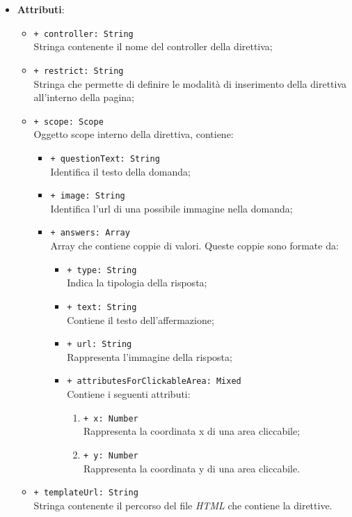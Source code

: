 \begin{itemize}
\begin{itemize}
			\end{itemize}
			\item \textbf{Attributi}: 
				\begin{itemize}
					\item \texttt{+ controller: String} \\ Stringa contenente il nome del controller della direttiva;
					\item \texttt{+ restrict: String} \\ Stringa che permette di definire le modalità di inserimento della direttiva all'interno della pagina;
					\item \texttt{+ scope: Scope} \\ Oggetto scope interno della direttiva, contiene:
					\begin{itemize}	
						\item \texttt{+ questionText: String} \\ Identifica il testo della domanda;
						\item \texttt{+ image: String} \\ Identifica l'url di una possibile immagine nella domanda;
						\item \texttt{+ answers: Array} \\ Array che contiene coppie di valori. Queste coppie sono formate da:
						\begin{itemize}
							\item \texttt{+ type: String} \\ Indica la tipologia della risposta;
							\item \texttt{+ text: String} \\ Contiene il testo dell'affermazione;
							\item \texttt{+ url: String} \\ Rappresenta l'immagine della risposta;
							\item \texttt{+ attributesForClickableArea: Mixed} \\ Contiene i seguenti attributi:
							\begin{enumerate}
								\item \texttt{+ x: Number} \\ Rappresenta la coordinata x di una area cliccabile;
								\item \texttt{+ y: Number} \\ Rappresenta la coordinata y di una area cliccabile.
							\end{enumerate}
						\end{itemize}
					\end{itemize}
					\item \texttt{+ templateUrl: String} \\ Stringa contenente il percorso del file \textit{HTML} che contiene la direttive.
				
				\end{itemize}
		\end{itemize}